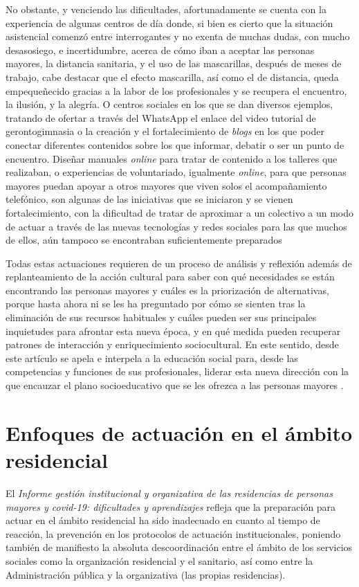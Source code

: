 \documentclass[spanish]{textolivre}
\begin{document}
No obstante, y venciendo las dificultades, afortunadamente se cuenta con la experiencia de algunas centros de día donde, si bien es cierto que la situación asistencial comenzó entre interrogantes y no exenta de muchas dudas, con mucho desasosiego, e incertidumbre, acerca de cómo iban a aceptar las personas mayores, la distancia sanitaria, y el uso de las mascarillas, después de meses de trabajo, cabe destacar que el efecto mascarilla, así como el de distancia, queda empequeñecido gracias a la labor de los profesionales y se recupera el encuentro, la ilusión, y la alegría. O centros sociales en los que se dan diversos ejemplos, tratando de ofertar a través del WhatsApp el enlace del video tutorial de gerontogimnasia o la creación y el fortalecimiento  de \emph{blogs} en los que poder conectar diferentes contenidos sobre los que informar, debatir o ser un punto de encuentro. Diseñar manuales \emph{online} para tratar de contenido a los talleres que realizaban,  o experiencias de voluntariado, igualmente \emph{online}, para que personas mayores puedan apoyar a otros mayores que viven solos el acompañamiento telefónico, son algunas de las iniciativas que se iniciaron y se vienen fortalecimiento, con la dificultad de tratar de aproximar a un colectivo a un modo de actuar a través de las nuevas tecnologías y redes sociales para las que muchos de ellos, aún tampoco se encontraban suficientemente preparados

Todas estas actuaciones requieren de un proceso de análisis y reflexión además de replanteamiento de la acción cultural para saber con qué necesidades se están encontrando las personas mayores y cuáles es la priorización de alternativas, porque hasta ahora ni se les ha preguntado por cómo se sienten tras la eliminación de sus recursos habituales y cuáles pueden ser sus principales inquietudes para afrontar esta nueva época, y en qué medida pueden recuperar patrones de interacción y enriquecimiento sociocultural. En este sentido, desde este artículo se apela e interpela a la educación social para, desde las competencias y funciones de sus profesionales, liderar esta nueva dirección con la que encauzar el plano socioeducativo que se les ofrezca a las personas mayores \cite{caride2020}. %

\section{Enfoques de actuación en el ámbito residencial}
El \emph{Informe gestión institucional y organizativa de las residencias de personas mayores y covid-19: dificultades y aprendizajes} \cite{del_pino2020} refleja que la preparación para actuar en el ámbito residencial ha sido inadecuado en cuanto al tiempo de reacción, la prevención en los protocolos de actuación institucionales, poniendo también de manifiesto la absoluta descoordinación entre el ámbito de los servicios sociales como la organización residencial y el sanitario, así como entre la Administración pública y la organizativa (las propias residencias).
\end{document}
